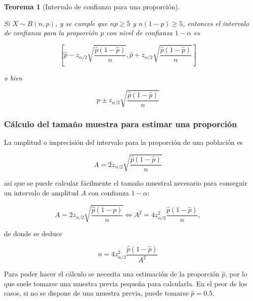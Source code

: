 \documentclass[
  a4paper,
]{scrreport}
\theoremstyle{definition}
\theoremstyle{definition}
\theoremstyle{plain}
\newtheorem{theorem}{Teorema}[chapter]
\theoremstyle{remark}
\begin{document}
\begin{theorem}[Intervalo de confianza para una
proporción]\protect\hypertarget{thm-intervalo-confianza-proporcion}{}\label{thm-intervalo-confianza-proporcion}

Si \(X\sim B(n,p)\), y se cumple que \(np\geq 5\) y \(n(1-p)\geq 5\),
entonces el \emph{intervalo de confianza para la proporción} \(p\) con
nivel de confianza \(1-\alpha\) es

\[
\left[\hat{p}-z_{\alpha/2}\sqrt{\frac{\hat{p}(1-\hat{p})}{n}},\hat{p}+z_{\alpha/2}\sqrt{\frac{\hat{p}(1-\hat{p})}{n}}\right]
\]

o bien

\[
\hat{p}\pm z_{\alpha/2}\sqrt{\frac{\hat{p}(1-\hat{p})}{n}}
\]

\end{theorem}

\hypertarget{cuxe1lculo-del-tamauxf1o-muestra-para-estimar-una-proporciuxf3n}{%
\subsubsection{Cálculo del tamaño muestra para estimar una
proporción}\label{cuxe1lculo-del-tamauxf1o-muestra-para-estimar-una-proporciuxf3n}}

La amplitud o imprecisión del intervalo para la proporción de una
población es

\[
A= 2 z_{\alpha/2}\sqrt{\frac{\hat{p}(1-\hat{p})}{n}}
\]

así que se puede calcular fácilmente el tamaño muestral necesario para
conseguir un intervalo de amplitud \(A\) con confianza \(1-\alpha\):

\[
A= 2 z_{\alpha/2}\sqrt{\frac{\hat{p}(1-\hat{p})}{n}} \Leftrightarrow A^2= 4 z_{\alpha/2}^2\frac{\hat{p}(1-\hat{p})}{n},
\]

de donde se deduce

\[
{n= 4 z_{\alpha/2}^2\frac{\hat{p}(1-\hat{p})}{A^2}}
\]

Para poder hacer el cálculo se necesita una estimación de la proporción
\(\hat{p}\), por lo que suele tomarse una muestra previa pequeña para
calcularla. En el peor de los casos, si no se dispone de una muestra
previa, puede tomarse \(\hat{p}=0.5\).
\end{document}
